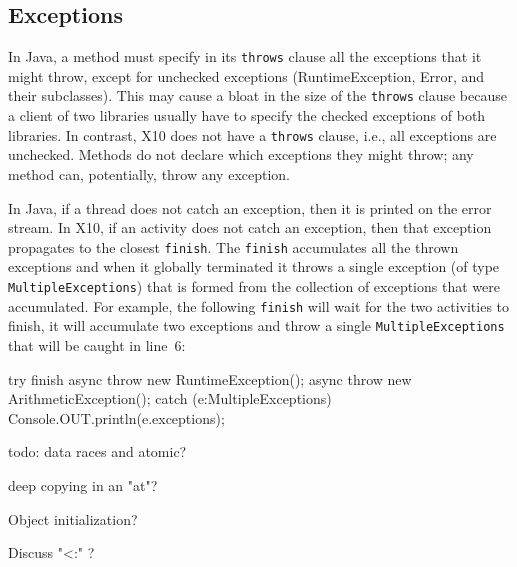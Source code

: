 \documentclass[a4paper]{article}
\def\codesmaller{\small}
\newcommand{\code}[1]{\texttt{\textup{\codesmaller #1}}}
\begin{document}
\subsection{Exceptions}
In Java, a method must specify in its \code{throws} clause all the exceptions that it might throw,
    except for unchecked exceptions (RuntimeException, Error, and their subclasses).
This may cause a bloat in the size of the \code{throws} clause because a client of two libraries usually have to
    specify the checked exceptions of both libraries.
In contrast, X10 does not have a \code{throws} clause, i.e.,  all exceptions are unchecked.
Methods do not declare which exceptions they might throw; any method can, potentially, throw any exception.

In Java, if a thread does not catch an exception, then it is printed on the error stream.
In X10, if an activity does not catch an exception, then that exception propagates to the closest \code{finish}.
The \code{finish} accumulates all the thrown exceptions and when it globally terminated it throws
    a single exception (of type \code{MultipleExceptions}) that is formed from the collection of exceptions that were accumulated.
For example, the following \code{finish} will wait for the two activities to finish,
    it will accumulate two exceptions and throw a single \code{MultipleExceptions}
    that will be caught in line~6:
\begin{xten}
try {
  finish {
    async { throw new RuntimeException(); }
    async { throw new ArithmeticException(); }
  }
} catch (e:MultipleExceptions) {
  Console.OUT.println(e.exceptions);
}
\end{xten}

 todo: data races and atomic?

 deep copying in an "at"?

Object initialization?


Discuss "<:" ?


\end{document}
